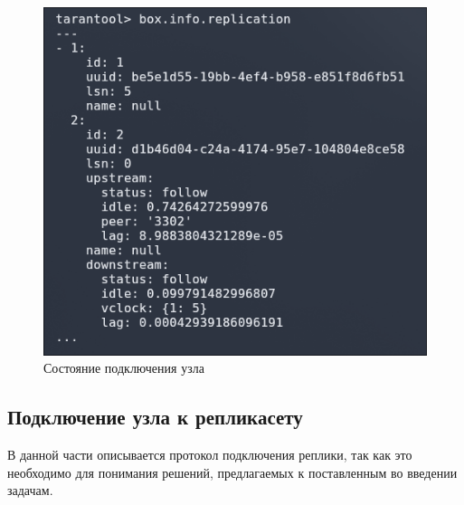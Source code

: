\begin{figure}
  \centering
  \includegraphics[scale=0.35]{inc/master-info.png}
  \caption{Состояние подключения узла}
  \label{fig:fig03}
\end{figure}


\subsection{Подключение узла к репликасету}

В данной части описывается протокол подключения реплики, так как это необходимо для понимания решений, предлагаемых к поставленным во введении задачам.

